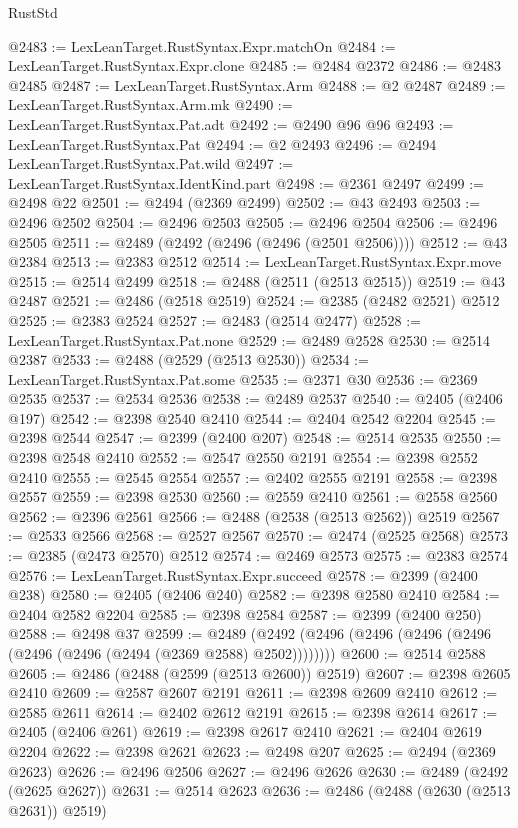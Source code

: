 \begin{lexlean}{RustStd}
\begin{coremodule}
@2483 := LexLeanTarget.RustSyntax.Expr.matchOn
@2484 := LexLeanTarget.RustSyntax.Expr.clone
@2485 := @2484 @2372
@2486 := @2483 @2485
@2487 := LexLeanTarget.RustSyntax.Arm
@2488 := @2 @2487
@2489 := LexLeanTarget.RustSyntax.Arm.mk
@2490 := LexLeanTarget.RustSyntax.Pat.adt
@2492 := @2490 @96 @96
@2493 := LexLeanTarget.RustSyntax.Pat
@2494 := @2 @2493
@2496 := @2494 LexLeanTarget.RustSyntax.Pat.wild
@2497 := LexLeanTarget.RustSyntax.IdentKind.part
@2498 := @2361 @2497
@2499 := @2498 @22
@2501 := @2494 (@2369 @2499)
@2502 := @43 @2493
@2503 := @2496 @2502
@2504 := @2496 @2503
@2505 := @2496 @2504
@2506 := @2496 @2505
@2511 := @2489 (@2492 (@2496 (@2496 (@2501 @2506))))
@2512 := @43 @2384
@2513 := @2383 @2512
@2514 := LexLeanTarget.RustSyntax.Expr.move
@2515 := @2514 @2499
@2518 := @2488 (@2511 (@2513 @2515))
@2519 := @43 @2487
@2521 := @2486 (@2518 @2519)
@2524 := @2385 (@2482 @2521) @2512
@2525 := @2383 @2524
@2527 := @2483 (@2514 @2477)
@2528 := LexLeanTarget.RustSyntax.Pat.none
@2529 := @2489 @2528
@2530 := @2514 @2387
@2533 := @2488 (@2529 (@2513 @2530))
@2534 := LexLeanTarget.RustSyntax.Pat.some
@2535 := @2371 @30
@2536 := @2369 @2535
@2537 := @2534 @2536
@2538 := @2489 @2537
@2540 := @2405 (@2406 @197)
@2542 := @2398 @2540 @2410
@2544 := @2404 @2542 @2204
@2545 := @2398 @2544
@2547 := @2399 (@2400 @207)
@2548 := @2514 @2535
@2550 := @2398 @2548 @2410
@2552 := @2547 @2550 @2191
@2554 := @2398 @2552 @2410
@2555 := @2545 @2554
@2557 := @2402 @2555 @2191
@2558 := @2398 @2557
@2559 := @2398 @2530
@2560 := @2559 @2410
@2561 := @2558 @2560
@2562 := @2396 @2561
@2566 := @2488 (@2538 (@2513 @2562)) @2519
@2567 := @2533 @2566
@2568 := @2527 @2567
@2570 := @2474 (@2525 @2568)
@2573 := @2385 (@2473 @2570) @2512
@2574 := @2469 @2573
@2575 := @2383 @2574
@2576 := LexLeanTarget.RustSyntax.Expr.succeed
@2578 := @2399 (@2400 @238)
@2580 := @2405 (@2406 @240)
@2582 := @2398 @2580 @2410
@2584 := @2404 @2582 @2204
@2585 := @2398 @2584
@2587 := @2399 (@2400 @250)
@2588 := @2498 @37
@2599 := @2489 (@2492 (@2496 (@2496 (@2496 (@2496 (@2496 (@2496 (@2494 (@2369 @2588) @2502))))))))
@2600 := @2514 @2588
@2605 := @2486 (@2488 (@2599 (@2513 @2600)) @2519)
@2607 := @2398 @2605 @2410
@2609 := @2587 @2607 @2191
@2611 := @2398 @2609 @2410
@2612 := @2585 @2611
@2614 := @2402 @2612 @2191
@2615 := @2398 @2614
@2617 := @2405 (@2406 @261)
@2619 := @2398 @2617 @2410
@2621 := @2404 @2619 @2204
@2622 := @2398 @2621
@2623 := @2498 @207
@2625 := @2494 (@2369 @2623)
@2626 := @2496 @2506
@2627 := @2496 @2626
@2630 := @2489 (@2492 (@2625 @2627))
@2631 := @2514 @2623
@2636 := @2486 (@2488 (@2630 (@2513 @2631)) @2519)

\end{coremodule}
\end{lexlean}

